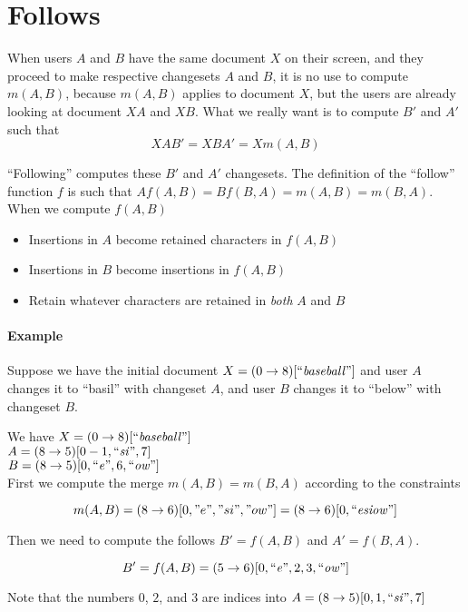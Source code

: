 \documentclass{article}
\begin{document}
\section{Follows} \label{follows}

When users $A$ and $B$ have the same document $X$ on their screen, and they proceed to make respective changesets $A$ and $B$, it is no use to compute $m(A,B)$, because $m(A,B)$ applies to document $X$, but the users are already looking at document $XA$ and $XB$.  What we really want is to compute $B'$ and $A'$ such that
$$XAB' = XBA' = Xm(A,B)$$

``Following'' computes these $B'$ and $A'$ changesets.  The definition of the ``follow'' function $f$ is such that $Af(A,B)=Bf(B,A)=m(A,B)=m(B,A)$.  When we compute $f(A,B)$
\begin{itemize}
\item Insertions in $A$ become retained characters in $f(A,B)$
\item Insertions in $B$ become insertions in $f(A,B)$
\item Retain whatever characters are retained in \emph{both} $A$ and $B$
\end{itemize}

\paragraph{Example}

Suppose we have the initial document $X=(0\rightarrow 8)[``\mathit{baseball}"]$ and user $A$ changes it to ``basil'' with changeset $A$, and user $B$ changes it to ``below'' with changeset $B$.

We have
$X=(0\rightarrow 8)[``\mathit{baseball}"]$ \\
$A=(8\rightarrow 5)[0-1, ``\mathit{si}", 7]$ \\
$B=(8\rightarrow 5)[0, ``\mathit{e}", 6, ``\mathit{ow}"]$ \\

First we compute the merge $m(A,B)=m(B,A)$ according to the constraints

$$m(A,B)=(8\rightarrow 6)[0, "e", "si", "ow"] = (8\rightarrow 6)[0, ``\mathit{esiow}"]$$

Then we need to compute the follows $B'=f(A,B)$ and $A'=f(B,A)$.

$$B'=f(A,B)=(5\rightarrow 6)[0,``\mathit{e}",2,3,``\mathit{ow}"]$$

Note that the numbers $0$, $2$, and $3$ are indices into $A=(8\rightarrow 5)[0,1,``\mathit{si}",7]$
\end{document}
